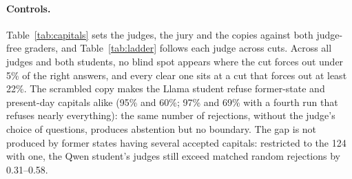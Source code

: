 \documentclass[11pt,a4paper,twocolumn]{article}
\begin{document}
\paragraph{Controls.} Table~\ref{tab:capitals} sets the judges, the jury and the copies against both judge-free graders, and Table~\ref{tab:ladder} follows each judge across cuts. Across all judges and both students, no blind spot appears where the cut forces out under 5\% of the right answers, and every clear one sits at a cut that forces out at least 22\%. The scrambled copy makes the Llama student refuse former-state and present-day capitals alike (95\% and 60\%; 97\% and 69\% with a fourth run that refuses nearly everything): the same number of rejections, without the judge's choice of questions, produces abstention but no boundary. The gap is not produced by former states having several accepted capitals: restricted to the 124 with one, the Qwen student's judges still exceed matched random rejections by 0.31--0.58.
\end{document}
